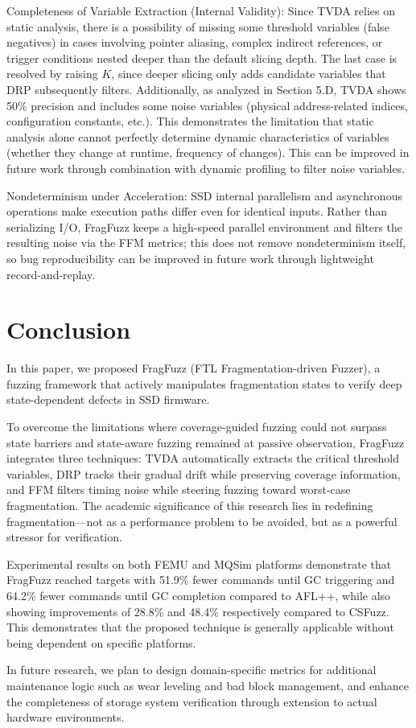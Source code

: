 \documentclass[conference]{IEEEtran}
\begin{document}
Completeness of Variable Extraction (Internal Validity): Since TVDA relies on static analysis, there is a possibility of missing some threshold variables (false negatives) in cases involving pointer aliasing, complex indirect references, or trigger conditions nested deeper than the default slicing depth.
The last case is resolved by raising $K$, since deeper slicing only adds candidate variables that DRP subsequently filters.
Additionally, as analyzed in Section 5.D, TVDA shows 50\% precision and includes some noise variables (physical address-related indices, configuration constants, etc.).
This demonstrates the limitation that static analysis alone cannot perfectly determine dynamic characteristics of variables (whether they change at runtime, frequency of changes).
This can be improved in future work through combination with dynamic profiling to filter noise variables.

Nondeterminism under Acceleration: SSD internal parallelism and asynchronous operations make execution paths differ even for identical inputs.
Rather than serializing I/O, FragFuzz keeps a high-speed parallel environment and filters the resulting noise via the FFM metrics; this does not remove nondeterminism itself, so bug reproducibility can be improved in future work through lightweight record-and-replay.

\section{Conclusion}
In this paper, we proposed FragFuzz (FTL Fragmentation-driven Fuzzer), a fuzzing framework that actively manipulates fragmentation states to verify deep state-dependent defects in SSD firmware.

To overcome the limitations where coverage-guided fuzzing could not surpass state barriers and state-aware fuzzing remained at passive observation, FragFuzz integrates three techniques: TVDA automatically extracts the critical threshold variables, DRP tracks their gradual drift while preserving coverage information, and FFM filters timing noise while steering fuzzing toward worst-case fragmentation.
The academic significance of this research lies in redefining fragmentation---not as a performance problem to be avoided, but as a powerful stressor for verification.

Experimental results on both FEMU and MQSim platforms demonstrate that FragFuzz reached targets with 51.9\% fewer commands until GC triggering and 64.2\% fewer commands until GC completion compared to AFL++, while also showing improvements of 28.8\% and 48.4\% respectively compared to CSFuzz.
This demonstrates that the proposed technique is generally applicable without being dependent on specific platforms.

In future research, we plan to design domain-specific metrics for additional maintenance logic such as wear leveling and bad block management, and enhance the completeness of storage system verification through extension to actual hardware environments.



\end{document}
